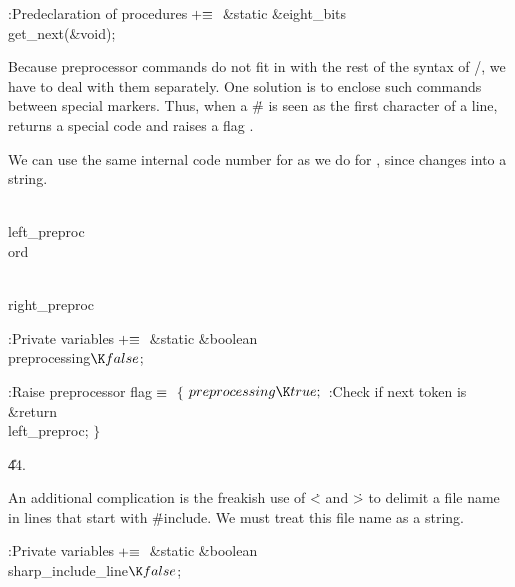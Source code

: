 \B{}:Predeclaration of procedures\X${}\mathrel+\equiv{}$\5
\&{static} \&{eight\_bits} \\{get\_next}(\&{void});\par
\fi

Because preprocessor commands do not fit in with the rest of the syntax
of \CEE/,
we have to deal with them separately.  One solution is to enclose such
commands between special markers.  Thus, when a \.\# is seen as the
first character of a line,  returns a special code
 and raises a flag .

We can use the same internal code number for  as we do
for , since  changes  into a string.

\Y\B\4\D\\{left\_preproc}\5
\\{ord}\par
\B\4\D\\{right\_preproc}\5
\par
\Y\B\4:Private variables\X${}\mathrel+\equiv{}$\6
\&{static} \&{boolean} \\{preprocessing}${}\K\\{false}{}$;\par
\fi

\B{}:Raise preprocessor flag\X${}\equiv{}$\6
${}\{{}$\1\6
${}\\{preprocessing}\K\\{true};{}$\6
:Check if next token is \X\6
\&{return} \\{left\_preproc};\6
\4${}\}{}$\2\par
\U44.\fi

An additional complication is the freakish use of \.< and \.> to delimit
a file name in lines that start with \.{\#include}.  We must treat this file
name as a string.

\Y\B\4:Private variables\X${}\mathrel+\equiv{}$\6
\&{static} \&{boolean} \\{sharp\_include\_line}${}\K\\{false}{}$;\par
\fi

